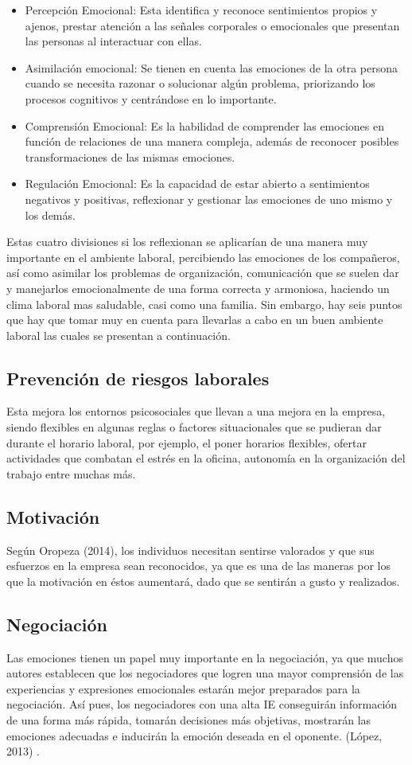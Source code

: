 \begin{itemize}
\item Percepción Emocional: Esta identifica y reconoce sentimientos propios y
ajenos, prestar atención a las señales corporales o emocionales que presentan
las personas al interactuar con ellas. 
\item Asimilación emocional: Se tienen en cuenta las emociones de la otra
persona cuando se necesita razonar o solucionar algún problema, priorizando los
procesos cognitivos y centrándose en lo importante.
\item Comprensión Emocional: Es la habilidad de comprender las emociones en
función de relaciones de una manera compleja, además de reconocer posibles
transformaciones de las mismas emociones.
\item Regulación Emocional: Es la capacidad de estar abierto a sentimientos
negativos y positivas, reflexionar y gestionar las emociones de uno mismo y los
demás.
\end{itemize}
Estas cuatro divisiones si los reflexionan se aplicarían de una manera muy
importante en el ambiente laboral, percibiendo las emociones de los compañeros,
así como asimilar los problemas de organización, comunicación que se suelen dar
y manejarlos emocionalmente de una forma correcta y armoniosa, haciendo un clima
laboral mas saludable, casi como una familia. Sin embargo, hay seis puntos que
hay que tomar muy en cuenta para llevarlas a cabo en un buen ambiente laboral
las cuales se presentan a continuación.
\subsection{Prevención de riesgos laborales}
Esta mejora los entornos psicosociales que llevan a una mejora en la empresa,
siendo flexibles en algunas reglas o factores situacionales que se pudieran dar
durante el horario laboral, por ejemplo, el poner horarios flexibles, ofertar
actividades que combatan el estrés en la oficina, autonomía en la organización
del trabajo entre muchas más.
\subsection{Motivación}
Según Oropeza (2014), los individuos necesitan sentirse valorados y que sus
esfuerzos en la empresa sean reconocidos, ya que es una de las maneras por los
que la motivación en éstos aumentará, dado que se sentirán a gusto y realizados.
\subsection{Negociación}
Las emociones tienen un papel muy importante en la negociación, ya que muchos
autores establecen que los negociadores que logren una mayor comprensión de las
experiencias y expresiones emocionales estarán mejor preparados para la
negociación. Así pues, los negociadores con una alta IE conseguirán información
de una forma más rápida, tomarán decisiones más objetivas, mostrarán las
emociones adecuadas e inducirán la emoción deseada en el oponente. (López, 2013)
.
